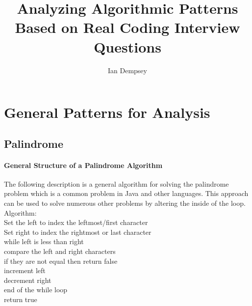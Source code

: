 \documentclass[twocolumn]{article}
\title{Analyzing Algorithmic Patterns Based on Real Coding Interview Questions}
\author{Ian Dempsey}
\begin{document}
\maketitle
{}

\newpage
{}

\section{General Patterns for Analysis}
\subsection{Palindrome}
\paragraph{General Structure of a Palindrome Algorithm}
The following description is a general algorithm for solving the palindrome problem which is a common problem in Java and other languages. This approach can be used to solve numerous other problems by altering the inside of the loop.\\
Algorithm:\\
Set the left to index the leftmost/first character\\
Set right to index the rightmost or last character\\
while left is less than right\\
\hspace*{0.5in}	compare the left and right characters\\
\hspace*{0.5in}	if they are not equal then return false\\
\hspace*{0.5in}	increment left\\
\hspace*{0.5in}	decrement right\\
end of the while loop\\
return true 
\end{document}
